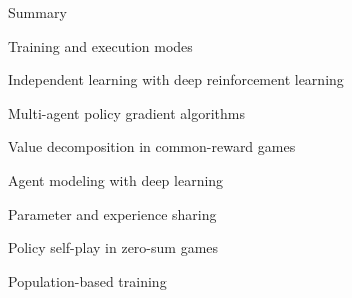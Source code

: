 \begin{frame}{Summary}

    \blist
        \item Training and execution modes
        \item Independent learning with deep reinforcement learning
        \item Multi-agent policy gradient algorithms
        \item Value decomposition in common-reward games
    \elist


    \blist
        \item Agent modeling with deep learning
        \item Parameter and experience sharing
        \item Policy self-play in zero-sum games
        \item Population-based training
    \elist
    
\end{frame}


